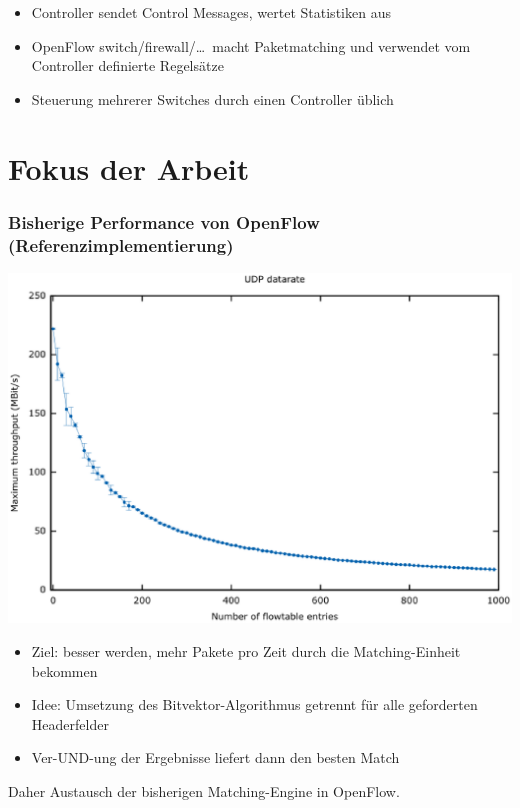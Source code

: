 \documentclass{beamer}
\begin{document}
\begin{frame}
    \begin{itemize}
        \item Controller sendet Control Messages, wertet Statistiken aus
        \item OpenFlow switch/firewall/\dots\ macht Paketmatching und verwendet vom Controller definierte Regelsätze
        \item Steuerung mehrerer Switches durch einen Controller üblich
    \end{itemize}
\end{frame}

\section{Fokus der Arbeit}
\begin{frame}
\frametitle{Bisherige Performance von OpenFlow (Referenzimplementierung)}
\begin{center}
\includegraphics[height=0.7\textheight]{img/test_initial_long.eps}
\end{center}
\end{frame}

\begin{frame}
\begin{itemize}
    \item Ziel: besser werden, mehr Pakete pro Zeit durch die Matching-Einheit bekommen
    \item Idee: Umsetzung des Bitvektor-Algorithmus getrennt für alle geforderten Headerfelder
    \item Ver-UND-ung der Ergebnisse liefert dann den besten Match
\end{itemize}
Daher Austausch der bisherigen Matching-Engine in OpenFlow.
\end{frame}
\end{document}
